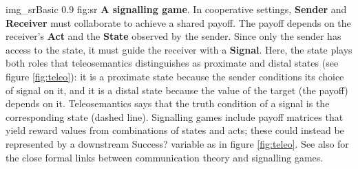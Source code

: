 \begin{myfig}
    {img_srBasic} %
    {0.9} %
    {fig:sr} %
    {\textbf{A signalling game}.
    In cooperative settings, \textbf{Sender} and \textbf{Receiver} must collaborate to achieve a shared payoff.
    The payoff depends on the receiver's \textbf{Act} and the \textbf{State} observed by the sender.
    Since only the sender has access to the state, it must guide the receiver with a \textbf{Signal}.
    Here, the state plays both roles that teleosemantics distinguishes as proximate and distal states (see figure \ref{fig:teleo}): it is a proximate state because the sender conditions its choice of signal on it, and it is a distal state because the value of the target (the payoff) depends on it.
    Teleosemantics says that the truth condition of a signal is the corresponding state (dashed line).
    Signalling games include payoff matrices that yield reward values from combinations of states and acts; these could instead be represented by a downstream Success? variable as in figure \ref{fig:teleo}.
    See also \citet{martinez2019deception} for the close formal links between communication theory and signalling games.
    } %
\end{myfig}